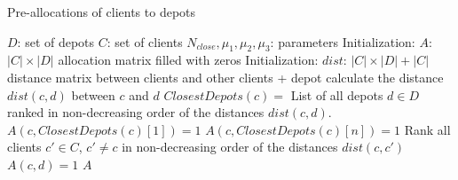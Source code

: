 \documentclass[a4paper,10pt]{article}
\begin{document}
\begin{linenumbers}
\begin{algorithm}
	\caption{Pre-allocations of clients to depots}
	\label{algo:pre-allocation}
	\begin{algorithmic}[1]
		\REQUIRE  $D$: set of depots
		\REQUIRE $C$: set of clients
		\REQUIRE $N_{close}, \mu_1, \mu_2, \mu_3$: parameters 
		\STATE
		\STATE Initialization: $A$: $|C| \times |D|$ allocation matrix filled with zeros
		\STATE Initialization: $dist$: $|C|\times|D|+|C|$ distance matrix between clients and other clients + depot
		\STATE
				\STATE calculate the distance $dist(c,d)$ between $c$ and $d$
			\ENDFOR
		\ENDFOR
		\STATE
			\STATE $ClosestDepots(c) = $ List of all depots $d \in D$ ranked in non-decreasing order of the distances $dist(c,d)$.
			\STATE 	$A(c,ClosestDepots(c)[1]) =1$ 	
					\STATE 	$A(c,ClosestDepots(c)[n]) =1$ 	
				\ENDIF
			\ENDFOR
		\ENDFOR
		\STATE
			\STATE Rank all clients $c' \in C$, $c' \neq c$ in non-decreasing order of the distances $dist(c,c')$ 
							\STATE $A(c,d) =1$
						\ENDIF
					\ENDFOR
				\ENDIF
			\ENDFOR
		\ENDFOR
		\RETURN $A$
	\end{algorithmic}
\end{algorithm}






\end{linenumbers}
\end{document}

